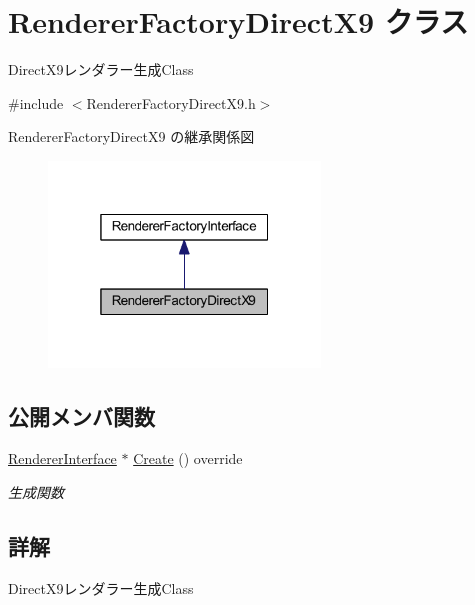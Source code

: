 \hypertarget{class_renderer_factory_direct_x9}{}\section{Renderer\+Factory\+Direct\+X9 クラス}
\label{class_renderer_factory_direct_x9}


Direct\+X9レンダラー生成\+Class  




{\ttfamily \#include $<$Renderer\+Factory\+Direct\+X9.\+h$>$}



Renderer\+Factory\+Direct\+X9 の継承関係図\nopagebreak
\begin{figure}[H]
\begin{center}
\leavevmode
\includegraphics[width=205pt]{class_renderer_factory_direct_x9__inherit__graph}
\end{center}
\end{figure}
\subsection*{公開メンバ関数}
\begin{DoxyCompactItemize}
\item 
\mbox{\hyperlink{class_renderer_interface}{Renderer\+Interface}} $\ast$ \mbox{\hyperlink{class_renderer_factory_direct_x9_a55541ea707af7ba3c006b0ea11a1fd49}{Create}} () override
\begin{DoxyCompactList}\small\item\em 生成関数 \end{DoxyCompactList}\end{DoxyCompactItemize}


\subsection{詳解}
Direct\+X9レンダラー生成\+Class 

